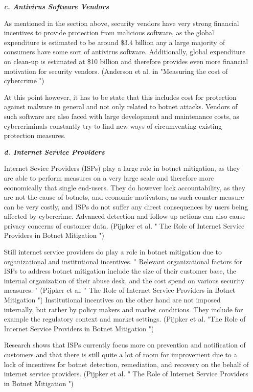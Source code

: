			\textbf{\textit{c. Antivirus Software Vendors}}
			
		As mentioned in the section above, security vendors have very strong financial incentives to provide protection from malicious software, as the global expenditure is estimated to be around \$3.4 billion any a large majority of consumers have some sort of antivirus software. Additionally, global expenditure on clean-up is estimated at \$10 billion and therefore provides even more financial motivation for security vendors. (Anderson et al. in "Measuring the cost of cybercrime ")

At this point however, it has to be state that this includes cost for protection against malware in general and not only related to botnet attacks. Vendors of such software are also faced with large development and maintenance costs, as cybercriminals constantly try to find new ways of circumventing existing protection measures.

			\textbf{\textit{d. Internet Service Providers}}
			
		Internet Sevice Providers (ISPs) play a large role in botnet mitigation, as they are able to perform measures on a very large scale and therefore more economically that single end-users. They do however lack accountability, as they are not the cause of botnets, and economic motivators, as such counter measure can be very costly, and ISPs do not suffer any direct consequences by users being affected by cybercrime. Advanced detection and follow up actions can also cause privacy concerns of customer data. (Pijpker et al. " The Role of Internet Service Providers in Botnet Mitigation ")

Still internet service providers do play a role in botnet mitigation due to organizational and institutional incentives. " Relevant organizational factors for ISPs to address botnet mitigation include the size of their customer base, the internal organization of their abuse desk, and the cost spend on various security measures. " (Pijpker et al. " The Role of Internet Service Providers in Botnet Mitigation ") Institutional incentives on the other hand are not imposed internally, but rather by policy makers and market conditions. They include for example the regulatory context and market settings. (Pijpker et al. "The Role of Internet Service Providers in Botnet Mitigation ")

Research shows that ISPs currently focus more on prevention and notification of customers and that there is still quite a lot of room for improvement due to a lock of incentives for botnet detection, remediation, and recovery on the behalf of internet service providers. (Pijpker et al. " The Role of Internet Service Providers in Botnet Mitigation ")

